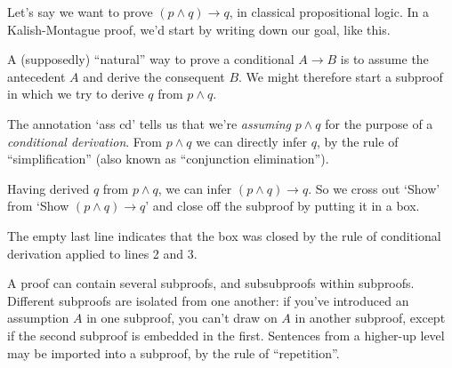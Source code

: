 \documentclass{../wobook2018}
\begin{document}

Let's say we want to prove $(p \land q) \to q$, in classical
propositional logic. In a Kalish-Montague proof, we'd start by writing
down our goal, like this.

\setlength{\proofwidth}{5cm}

\begin{KMcalc}[]
\end{KMcalc}

\noindent%
A (supposedly) ``natural'' way to prove a conditional $A\to B$ is to assume the
antecedent $A$ and derive the consequent $B$. We might therefore start a
subproof in which we try to derive $q$ from $p \land q$.

\begin{KMcalc}[]
\end{KMcalc}

\noindent%
The annotation `ass cd' tells us that we're \emph{assuming} $p\land q$
for the purpose of a \emph{conditional derivation}. From $p\land q$ we
can directly infer $q$, by the rule of ``simplification'' (also known as
``conjunction elimination'').

\begin{KMcalc}[]
\end{KMcalc}

\noindent%
Having derived $q$ from $p \land q$, we can infer $(p \land q) \to q$.
So we cross out `Show' from `Show $(p \land q) \to q$' and close off
the subproof by putting it in a box.
%
\begin{KMcalc}[]
  \KMclose[]
\end{KMcalc}
%
The empty last line indicates that the box was closed by the rule of
conditional derivation applied to lines 2 and 3.

A proof can contain several subproofs, and subsubproofs within
subproofs. Different subproofs are isolated from one another: if
you've introduced an assumption $A$ in one subproof, you can't draw on
$A$ in another subproof, except if the second subproof is embedded in
the first. Sentences from a higher-up level may be imported into a
subproof, by the rule of ``repetition''.
\end{document}
